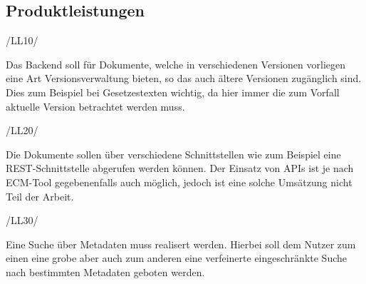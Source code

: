 \subsection{Produktleistungen} \label{Produktleistungen}
\begin{minipage}{3cm}
/LL10/
\end{minipage}
\begin{minipage}{13cm}
Das Backend soll f\"ur Dokumente, welche in verschiedenen Versionen vorliegen eine Art Versionsverwaltung bieten, so das auch \"altere Versionen zug\"anglich sind. Dies zum Beispiel bei Gesetzestexten wichtig, da hier immer die zum Vorfall aktuelle Version betrachtet werden muss.\\
\end{minipage}
\begin{minipage}{3cm}
/LL20/
\end{minipage}
\begin{minipage}{13cm}
Die Dokumente sollen \"uber verschiedene Schnittstellen wie zum Beispiel eine \ac{REST}-Schnittstelle abgerufen werden k\"onnen. Der Einsatz von \ac{API}s ist je nach \ac{ECM}-Tool gegebenenfalls auch m\"oglich, jedoch ist eine solche Ums\"atzung nicht Teil der Arbeit. \cite{Wiki_REST}\\
\end{minipage}
\begin{minipage}{3cm}
/LL30/
\end{minipage}
\begin{minipage}{13cm}
Eine Suche \"uber Metadaten muss realisert werden. Hierbei soll dem Nutzer zum einen eine grobe aber auch zum anderen eine verfeinerte eingeschr\"ankte Suche nach bestimmten Metadaten geboten werden.\\
\end{minipage}